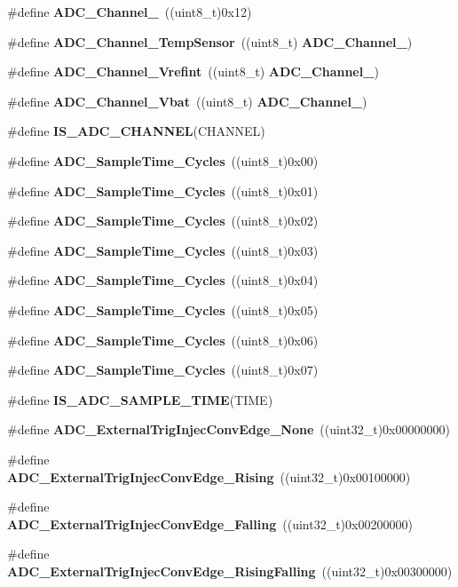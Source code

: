 \begin{DoxyCompactItemize}
\item 
\#define \textbf{ A\+D\+C\+\_\+\+Channel\+\_}~((uint8\+\_\+t)0x12)
\item 
\#define \textbf{ A\+D\+C\+\_\+\+Channel\+\_\+\+Temp\+Sensor}~((uint8\+\_\+t)\textbf{ A\+D\+C\+\_\+\+Channel\+\_})
\item 
\#define \textbf{ A\+D\+C\+\_\+\+Channel\+\_\+\+Vrefint}~((uint8\+\_\+t)\textbf{ A\+D\+C\+\_\+\+Channel\+\_})
\item 
\#define \textbf{ A\+D\+C\+\_\+\+Channel\+\_\+\+Vbat}~((uint8\+\_\+t)\textbf{ A\+D\+C\+\_\+\+Channel\+\_})
\item 
\#define \textbf{ I\+S\+\_\+\+A\+D\+C\+\_\+\+C\+H\+A\+N\+N\+EL}(C\+H\+A\+N\+N\+EL)
\item 
\#define \textbf{ A\+D\+C\+\_\+\+Sample\+Time\+\_\+Cycles}~((uint8\+\_\+t)0x00)
\item 
\#define \textbf{ A\+D\+C\+\_\+\+Sample\+Time\+\_\+Cycles}~((uint8\+\_\+t)0x01)
\item 
\#define \textbf{ A\+D\+C\+\_\+\+Sample\+Time\+\_\+Cycles}~((uint8\+\_\+t)0x02)
\item 
\#define \textbf{ A\+D\+C\+\_\+\+Sample\+Time\+\_\+Cycles}~((uint8\+\_\+t)0x03)
\item 
\#define \textbf{ A\+D\+C\+\_\+\+Sample\+Time\+\_\+Cycles}~((uint8\+\_\+t)0x04)
\item 
\#define \textbf{ A\+D\+C\+\_\+\+Sample\+Time\+\_\+Cycles}~((uint8\+\_\+t)0x05)
\item 
\#define \textbf{ A\+D\+C\+\_\+\+Sample\+Time\+\_\+Cycles}~((uint8\+\_\+t)0x06)
\item 
\#define \textbf{ A\+D\+C\+\_\+\+Sample\+Time\+\_\+Cycles}~((uint8\+\_\+t)0x07)
\item 
\#define \textbf{ I\+S\+\_\+\+A\+D\+C\+\_\+\+S\+A\+M\+P\+L\+E\+\_\+\+T\+I\+ME}(T\+I\+ME)
\item 
\#define \textbf{ A\+D\+C\+\_\+\+External\+Trig\+Injec\+Conv\+Edge\+\_\+\+None}~((uint32\+\_\+t)0x00000000)
\item 
\#define \textbf{ A\+D\+C\+\_\+\+External\+Trig\+Injec\+Conv\+Edge\+\_\+\+Rising}~((uint32\+\_\+t)0x00100000)
\item 
\#define \textbf{ A\+D\+C\+\_\+\+External\+Trig\+Injec\+Conv\+Edge\+\_\+\+Falling}~((uint32\+\_\+t)0x00200000)
\item 
\#define \textbf{ A\+D\+C\+\_\+\+External\+Trig\+Injec\+Conv\+Edge\+\_\+\+Rising\+Falling}~((uint32\+\_\+t)0x00300000)
\item 

\end{DoxyCompactItemize}
